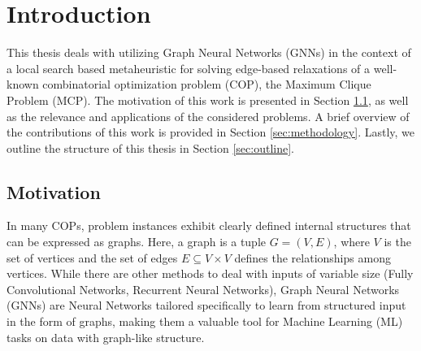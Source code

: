 \documentclass[draft,final]{vutinfth} %
\begin{document}
\frontmatter %

\addstatementpage

\begin{danksagung*}
\end{danksagung*}

\begin{acknowledgements*}
\end{acknowledgements*}

\begin{kurzfassung}
\end{kurzfassung}

\begin{abstract}
\end{abstract}


\tableofcontents %

\mainmatter

\chapter{Introduction}

This thesis deals with utilizing Graph Neural Networks (GNNs) in the context of a local search based metaheuristic for solving edge-based relaxations of a well-known combinatorial optimization problem (COP), the Maximum Clique Problem (MCP).
The motivation of this work is presented in Section \ref{sec:motivation}, as well as the relevance and applications of the considered problems. A brief overview of the contributions of this work is provided in Section \ref{sec:methodology}. Lastly, we outline the structure of this thesis in Section \ref{sec:outline}.

\section{Motivation}\label{sec:motivation}
In many COPs, problem instances exhibit clearly defined internal structures that can be expressed as graphs. Here, a graph is a tuple $G = (V, E)$, where $V$ is the set of vertices and the set of edges $E \subseteq V \times V$ defines the relationships among vertices. While there are other methods to deal with inputs of variable size (Fully Convolutional Networks, Recurrent Neural Networks), Graph Neural Networks (GNNs) are Neural Networks tailored specifically to learn from structured input in the form of graphs, making them a valuable tool for Machine Learning (ML) tasks on data with graph-like structure.   
\end{document}
